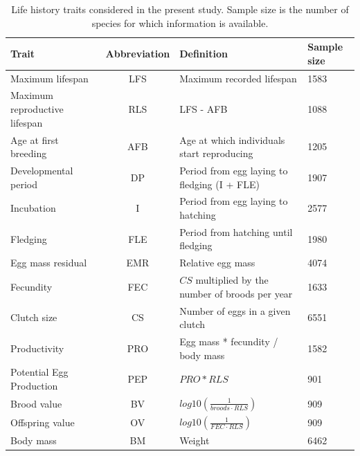 \begin{table}
\caption[Life history traits]{Life history traits considered in the present
study. Sample size is the number of species for which information is
available.}\label{tab:table2.1}
\begin{tabular}{@{}p{2.5cm}cp{7.5cm}p{1.5cm}@{}}
\toprule
Trait                         & Abbreviation & Definition                                   & Sample size \\
\midrule
Maximum lifespan              & LFS          & Maximum recorded lifespan                    & 1583        \\
Maximum reproductive lifespan & RLS          & LFS - AFB                                    & 1088        \\
Age at first breeding         & AFB          & Age at which individuals start reproducing   & 1205        \\
Developmental period          & DP           & Period from egg laying to fledging (I + FLE) & 1907        \\
Incubation                    & I            & Period from egg laying to hatching           & 2577        \\
Fledging                      & FLE          & Period from hatching until fledging          & 1980        \\
Egg mass residual             & EMR          & Relative egg mass                            & 4074        \\
Fecundity                     & FEC          & $CS$ multiplied by the number of broods per year         & 1633 \\
Clutch size                   & CS           & Number of eggs in a given clutch             & 6551 \\
Productivity                  & PRO          & Egg mass * fecundity / body mass             & 1582 \\
Potential Egg Production      & PEP          & $PRO * RLS$                                  & 901 \\
Brood value                   & BV           & $log10\left(\tfrac{1}{ broods \cdot RLS } \right)$       & 909  \\
Offspring value               & OV           & $log10\left(\tfrac{1}{ FEC \cdot RLS } \right)$          & 909 \\
Body mass                     & BM           & Weight                                       & 6462        \\
\bottomrule
\end{tabular}
\end{table}



